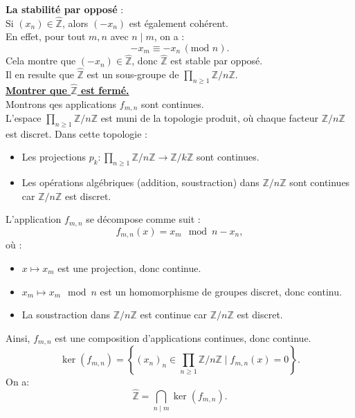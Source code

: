 \documentclass[a4paper, 14pt]{report}
\begin{document}
\begin{onehalfspace}
{\textbf{La stabilité par opposé} :\\
Si $(x_n) \in \widehat{\mathbb{Z}}$, alors $(-x_n)$ est également cohérent.\\
 En effet, pour tout $m, n$ avec $n \mid m$, on a :
\[
-x_m \equiv -x_n \, (\text{mod } n).
\]
Cela montre que $(-x_n) \in \widehat{\mathbb{Z}}$, donc $\widehat{\mathbb{Z}}$ est stable par opposé.\\
Il en resulte que \( \widehat{\mathbb{Z}} \) est un sous-groupe de \( \prod_{n \geq 1} \mathbb{Z}/n\mathbb{Z} \).\\


\textbf{\underline{Montrer que \( \widehat{\mathbb{Z}} \) est fermé.}}\\ 
Montrons qes applications \(f_{m,n}\) sont continues.\\
L'espace \(\prod_{n \geq 1} \mathbb{Z}/n\mathbb{Z}\) est muni de la topologie produit, où chaque facteur \(\mathbb{Z}/n\mathbb{Z}\) est discret. Dans cette topologie :
\begin{itemize}
	\item Les projections \(p_k : \prod_{n \geq 1} \mathbb{Z}/n\mathbb{Z} \to \mathbb{Z}/k\mathbb{Z}\) sont continues.
	\item Les opérations algébriques (addition, soustraction) dans \(\mathbb{Z}/n\mathbb{Z}\) sont continues car \(\mathbb{Z}/n\mathbb{Z}\) est discret.
\end{itemize}
L'application \(f_{m,n}\) se décompose comme suit :
\[
f_{m,n}(x) = x_m \mod n - x_n,
\]
où :
\begin{itemize}
	\item \(x \mapsto x_m\) est une projection, donc continue.
	\item \(x_m \mapsto x_m \mod n\) est un homomorphisme de groupes discret, donc continu.
	\item La soustraction dans \(\mathbb{Z}/n\mathbb{Z}\) est continue car \(\mathbb{Z}/n\mathbb{Z}\) est discret.
\end{itemize}
Ainsi, \(f_{m,n}\) est une composition d'applications continues, donc continue.
\[
\ker(f_{m,n}) = \left\{  (x_n)_n \in \prod_{n \geq 1} \mathbb{Z}/n\mathbb{Z} \mid f_{m,n}(x) = 0 \right\}.
\]
On a:
\[
\widehat{\mathbb{Z}} = \bigcap_{n \mid m} \ker(f_{m,n}).
\]

}
\end{onehalfspace}
\end{document}
